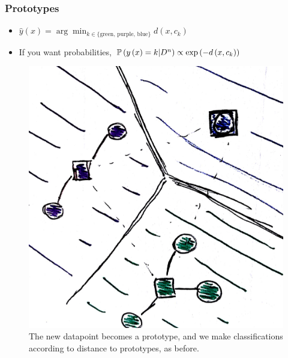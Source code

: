 \documentclass[10pt,mathserif]{beamer}
\begin{document}
\begin{frame}
  \frametitle{Prototypes}
 \begin{itemize}
 \item $\hat{y}\left(x\right) = \arg\min_{k \in \{\text{green, purple, blue}\}} d\left(x, c_k\right)$
 \item If you want probabilities, $\mathbb{P}\left({y\left(x\right) = k \vert D^n}\right) \propto \operatorname{exp}\left(-d\left(x, c_k \right)\right)$
 \end{itemize} 
\begin{figure}[ht]
  \centering
  \includegraphics[width=0.7\paperwidth]{figure/prototypes_5}
  \caption{The new datapoint becomes a prototype, and we make classifications
    according to distance to prototypes, as before.\label{fig:prototypes_5} }
\end{figure}
\end{frame}
\end{document}
